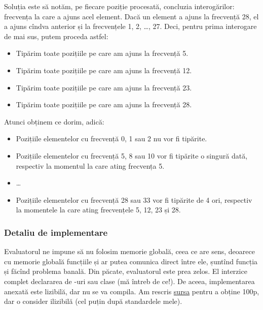 \documentclass[../main.tex]{subfiles}
\begin{document}
Soluția este să notăm, pe fiecare poziție procesată, concluzia interogărilor: frecvența la care a ajuns acel element. Dacă un element a ajuns la frecvență 28, el a ajuns cîndva anterior și la frecvențele 1, 2, \dots, 27. Deci, pentru prima interogare de mai sus, putem proceda astfel:

\begin{itemize}
  \item Tipărim toate pozițiile pe care am ajuns la frecvență 5.
  \item Tipărim toate pozițiile pe care am ajuns la frecvență 12.
  \item Tipărim toate pozițiile pe care am ajuns la frecvență 23.
  \item Tipărim toate pozițiile pe care am ajuns la frecvență 28.
\end{itemize}

Atunci obținem ce dorim, adică:

\begin{itemize}
  \item Pozițiile elementelor cu frecvență 0, 1 sau 2 nu vor fi tipărite.

  \item Pozițiile elementelor cu frecvență 5, 8 sau 10 vor fi tipărite o singură dată, respectiv la momentul la care ating frecvența 5.

  \item \dots

  \item Pozițiile elementelor cu frecvență 28 sau 33 vor fi tipărite de 4 ori, respectiv la momentele la care ating frecvențele 5, 12, 23 și 28.
\end{itemize}

\subsubsection*{Detaliu de implementare}

Evaluatorul ne impune să nu folosim memorie globală, ceea ce are sens, deoarece cu memorie globală funcțiile  și  ar putea comunica direct între ele, șuntînd funcția  și făcînd problema banală. Din păcate, evaluatorul este prea zelos. El interzice complet declararea de -uri sau clase (mă întreb de ce!). De aceea, implementarea anexată este lizibilă, dar nu se va compila. Am rescris \href{https://kilonova.ro/submissions/772576}{sursa} pentru a obține 100p, dar o consider ilizibilă (cel puțin după standardele mele).
\end{document}
